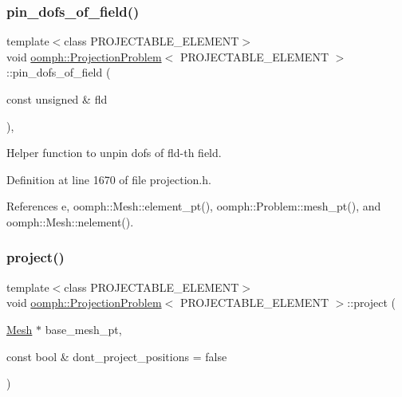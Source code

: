 \mbox{\label{classoomph_1_1ProjectionProblem_acff96fd0e3dda445ba806e253988c547}} 
\subsubsection{\texorpdfstring{pin\+\_\+dofs\+\_\+of\+\_\+field()}{pin\_dofs\_of\_field()}}
{\footnotesize\ttfamily template$<$class P\+R\+O\+J\+E\+C\+T\+A\+B\+L\+E\+\_\+\+E\+L\+E\+M\+E\+NT$>$ \\
void \hyperlink{classoomph_1_1ProjectionProblem}{oomph\+::\+Projection\+Problem}$<$ P\+R\+O\+J\+E\+C\+T\+A\+B\+L\+E\+\_\+\+E\+L\+E\+M\+E\+NT $>$\+::pin\+\_\+dofs\+\_\+of\+\_\+field (\begin{DoxyParamCaption}\item[{const unsigned \&}]{fld }\end{DoxyParamCaption})\hspace{0.3cm}{\ttfamily [inline]}, {\ttfamily [private]}}



Helper function to unpin dofs of fld-\/th field. 



Definition at line 1670 of file projection.\+h.



References e, oomph\+::\+Mesh\+::element\+\_\+pt(), oomph\+::\+Problem\+::mesh\+\_\+pt(), and oomph\+::\+Mesh\+::nelement().

\mbox{\label{classoomph_1_1ProjectionProblem_ad972f78212e515a03d1018996115265a}} 
\subsubsection{\texorpdfstring{project()}{project()}}
{\footnotesize\ttfamily template$<$class P\+R\+O\+J\+E\+C\+T\+A\+B\+L\+E\+\_\+\+E\+L\+E\+M\+E\+NT$>$ \\
void \hyperlink{classoomph_1_1ProjectionProblem}{oomph\+::\+Projection\+Problem}$<$ P\+R\+O\+J\+E\+C\+T\+A\+B\+L\+E\+\_\+\+E\+L\+E\+M\+E\+NT $>$\+::project (\begin{DoxyParamCaption}\item[{\hyperlink{classoomph_1_1Mesh}{Mesh} $\ast$}]{base\+\_\+mesh\+\_\+pt,  }\item[{const bool \&}]{dont\+\_\+project\+\_\+positions = {\ttfamily false} }\end{DoxyParamCaption})\hspace{0.3cm}{\ttfamily [inline]}}



